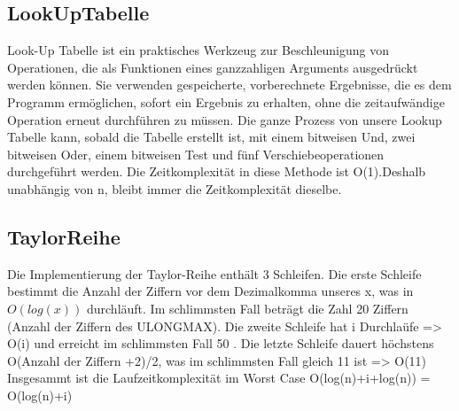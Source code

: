 \documentclass[course=erap]{aspdoc}
\begin{document}
\subsection{LookUpTabelle}
Look-Up Tabelle ist ein praktisches Werkzeug zur Beschleunigung von Operationen,
die als Funktionen eines ganzzahligen Arguments ausgedrückt werden können. Sie verwenden gespeicherte,
vorberechnete Ergebnisse, die es dem Programm ermöglichen, sofort ein Ergebnis zu erhalten,
ohne die zeitaufwändige Operation erneut durchführen zu müssen.
Die ganze Prozess von unsere Lookup Tabelle kann, sobald die Tabelle erstellt ist, mit einem bitweisen Und,
zwei bitweisen Oder, einem bitweisen Test und fünf Verschiebeoperationen durchgeführt werden. Die Zeitkomplexität in diese Methode ist O(1).Deshalb unabhängig von n, bleibt immer die Zeitkomplexität dieselbe.
\subsection{TaylorReihe}
Die Implementierung der Taylor-Reihe enthält 3 Schleifen. Die erste Schleife bestimmt die Anzahl der Ziffern vor dem Dezimalkomma unseres x, was in $O(log(x))$ durchläuft. Im schlimmsten Fall beträgt die Zahl 20 Ziffern (Anzahl der Ziffern des ULONGMAX).
Die zweite Schleife hat i Durchlaüfe => O(i) und erreicht im schlimmsten Fall 50 .
Die letzte Schleife dauert höchstens O(Anzahl der Ziffern
+2)/2, was im schlimmsten Fall gleich 11 ist => O(11)
Insgesammt ist die Laufzeitkomplexität im Worst Case O(log(n)+i+log(n)) = O(log(n)+i)
\end{document}
